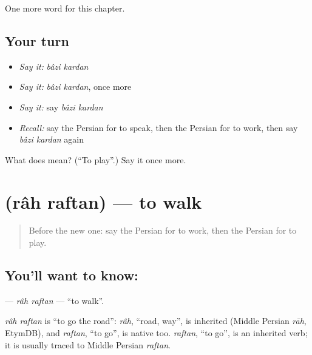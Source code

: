 \begin{grammarlens}[title={What you've built}]
One more word for this chapter.
\end{grammarlens}

\subsection*{Your turn}
\begin{itemize}
\raggedright
  \item \emph{Say it:} \emph{bâzi kardan}
  \item \emph{Say it:} \emph{bâzi kardan}, once more
  \item \emph{Say it:} say \emph{bâzi kardan}
  \item \emph{Recall:} say the Persian for to speak, then the Persian for to work, then say \emph{bâzi kardan} again
\end{itemize}

\begin{tcolorbox}[breakable,colback=teal!4,colframe=teal!35!black,title={Before you move on}]
What does   mean? (\textquotedblleft{}To play\textquotedblright{}.) Say it once more.
\end{tcolorbox}
\section[\texorpdfstring{\fa{راه} \fa{رفتن} (râh raftan)}{راه رفتن (râh raftan)}]{  (râh raftan) — to walk}

\label{lesson:FA-C217-rah-raftan}



\begin{quote}
Before the new one: say the Persian for to work, then the Persian for to play.
\end{quote}

\subsection*{You'll want to know:  }
\textbf{ } — \emph{râh raftan} — \textquotedblleft{}to walk\textquotedblright{}.

\begin{cousinweb}
\emph{râh raftan} is \textquotedblleft{}to go the road\textquotedblright{}: \emph{râh}, \textquotedblleft{}road, way\textquotedblright{}, is inherited (Middle Persian \emph{rāh}, EtymDB), and \emph{raftan}, \textquotedblleft{}to go\textquotedblright{}, is native too. \emph{raftan}, \textquotedblleft{}to go\textquotedblright{}, is an inherited verb; it is usually traced to Middle Persian \emph{raftan}.
\end{cousinweb}

